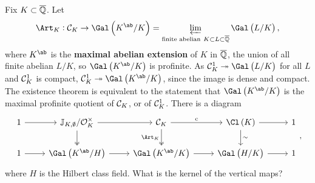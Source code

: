 Fix $ K \subset \overline{\mathbb{Q}} $. Let
$$ \Art_K : \CCC_K \to \Gal\br{K^{\ab} / K} = \varprojlim_{\text{finite abelian} \ K \subset L \subset \overline{\QQ}} \Gal\br{L / K}, $$
where $ K^{\ab} $ is the \textbf{maximal abelian extension} of $ K $ in $ \overline{\mathbb{Q}} $, the union of all finite abelian $ L / K $, so $ \Gal\br{K^{\ab} / K} $ is profinite. As $ \CCC_K^1 \twoheadrightarrow \Gal\br{L / K} $ for all $ L $ and $ \mathcal{C}_K^1 $ is compact, $ \CCC_K^1 \twoheadrightarrow \Gal\br{K^{\ab} / K} $, since the image is dense and compact. The existence theorem is equivalent to the statement that $ \Gal\br{K^{\ab} / K} $ is the maximal profinite quotient of $ \mathcal{C}_K $, or of $ \mathcal{C}_K^1 $. There is a diagram
$$
\begin{tikzcd}
1 \arrow{r} & \JJ_{K, \emptyset} / \OOO_K^\times \arrow{r} \arrow[twoheadrightarrow]{d} & \CCC_K \arrow{r}{\c} \arrow[twoheadrightarrow]{d}[swap]{\Art_K} & \Cl\br{K} \arrow{r} \arrow{d}{\sim} & 1 \\
1 \arrow{r} & \Gal\br{K^{\ab} / H} \arrow{r} & \Gal\br{K^{\ab} / K} \arrow{r} & \Gal\br{H / K} \arrow{r} & 1
\end{tikzcd},
$$
where $ H $ is the Hilbert class field. What is the kernel of the vertical maps?

